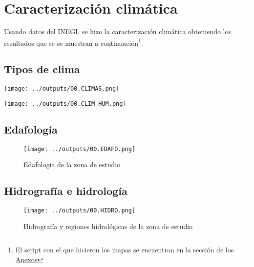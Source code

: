 \documentclass[
  11pt,
  letterpaper,
  DIV=11,
  numbers=noendperiod]{scrartcl}
\begin{document}
\section{Caracterización
climática}\label{caracterizaciuxf3n-climuxe1tica}

Usando datos del INEGI, se hizo la caracterización climática obteniendo
los resultados que se se muestran a continuación\footnote{El script con
  el que hicieron los mapas se encuentran en la sección de los
  \hyperref[script-mapas-de-caracterizaciuxf3n-climuxe1tica]{Anexos}}.

\subsection{Tipos de clima}\label{tipos-de-clima}

\begin{center}
\texttt{[image: ../outputs/00.CLIMAS.png]}
\end{center}
\begin{center}
\texttt{[image: ../outputs/00.CLIM\_HUM.png]}
\end{center}

\subsection{Edafología}\label{edafologuxeda}

\begin{figure}[H]

{\centering \texttt{[image: ../outputs/00.EDAFO.png]}

}

\caption{Edafología de la zona de estudio}

\end{figure}%

\subsection{Hidrografía e
hidrología}\label{hidrografuxeda-e-hidrologuxeda}

\begin{figure}[H]

{\centering \texttt{[image: ../outputs/00.HIDRO.png]}

}

\caption{Hidrografía y regiones hidrológicas de la zona de estudio}

\end{figure}%
\end{document}
